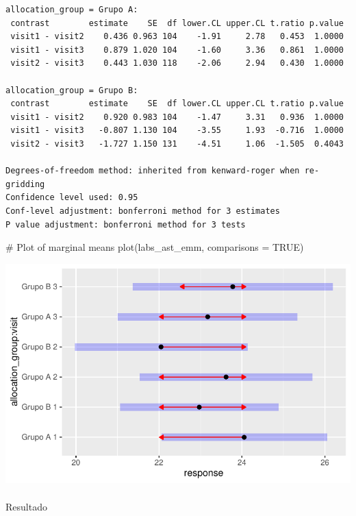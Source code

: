 \documentclass[
  12pt,
]{article}
\makeatletter
\let\oldparagraph\paragraph
\renewcommand{\paragraph}{
    \@ifstar
      \xxxParagraphStar
      \xxxParagraphNoStar
  }
\newcommand{\xxxParagraphStar}[1]{\oldparagraph*{#1}\mbox{}}
\newcommand{\xxxParagraphNoStar}[1]{\oldparagraph{#1}\mbox{}}
\newenvironment{Shaded}{\begin{snugshade}}{\end{snugshade}}
\newcommand{\AttributeTok}[1]{\textcolor[rgb]{0.40,0.45,0.13}{#1}}
\newcommand{\CommentTok}[1]{\textcolor[rgb]{0.37,0.37,0.37}{#1}}
\newcommand{\ConstantTok}[1]{\textcolor[rgb]{0.56,0.35,0.01}{#1}}
\newcommand{\FunctionTok}[1]{\textcolor[rgb]{0.28,0.35,0.67}{#1}}
\newcommand{\NormalTok}[1]{\textcolor[rgb]{0.00,0.23,0.31}{#1}}
\makeatother
\begin{document}
\begin{verbatim}
allocation_group = Grupo A:
 contrast        estimate    SE  df lower.CL upper.CL t.ratio p.value
 visit1 - visit2    0.436 0.963 104    -1.91     2.78   0.453  1.0000
 visit1 - visit3    0.879 1.020 104    -1.60     3.36   0.861  1.0000
 visit2 - visit3    0.443 1.030 118    -2.06     2.94   0.430  1.0000

allocation_group = Grupo B:
 contrast        estimate    SE  df lower.CL upper.CL t.ratio p.value
 visit1 - visit2    0.920 0.983 104    -1.47     3.31   0.936  1.0000
 visit1 - visit3   -0.807 1.130 104    -3.55     1.93  -0.716  1.0000
 visit2 - visit3   -1.727 1.150 131    -4.51     1.06  -1.505  0.4043

Degrees-of-freedom method: inherited from kenward-roger when re-gridding 
Confidence level used: 0.95 
Conf-level adjustment: bonferroni method for 3 estimates 
P value adjustment: bonferroni method for 3 tests 
\end{verbatim}

\begin{Shaded}
\begin{Highlighting}[]
\CommentTok{\# Plot of marginal means}
\FunctionTok{plot}\NormalTok{(labs\_ast\_emm, }\AttributeTok{comparisons =} \ConstantTok{TRUE}\NormalTok{)}
\end{Highlighting}
\end{Shaded}

\includegraphics{Outcomes_files/figure-pdf/labs_ast_sens_emm-1.pdf}

\paragraph{Resultado}\label{resultado}
\end{document}
